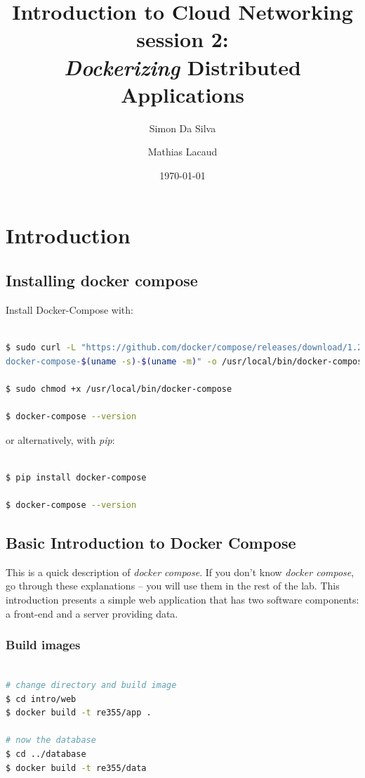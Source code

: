 \documentclass[a4paper,11pt]{exam}
\date{\today}
\title{Introduction to Cloud Networking session 2: \\
\textit{Dockerizing} Distributed Applications}
\author{Simon Da Silva \and Mathias Lacaud}
\begin{document}
	
		
	
\maketitle


\section{Introduction}
\subsection{Installing docker compose}
Install Docker-Compose with:

\begin{lstlisting}[frame=single,language={sh}]  % Start your code-block

$ sudo curl -L "https://github.com/docker/compose/releases/download/1.22.0/
docker-compose-$(uname -s)-$(uname -m)" -o /usr/local/bin/docker-compose

$ sudo chmod +x /usr/local/bin/docker-compose

$ docker-compose --version
\end{lstlisting}

or alternatively, with \textit{pip}: 

\begin{lstlisting}[frame=single,language={sh}]  % Start your code-block

$ pip install docker-compose

$ docker-compose --version
\end{lstlisting}


\subsection{Basic Introduction to Docker Compose}

This is a quick description of \textit{docker compose}. If you don't know \textit{docker compose}, go through these explanations -- you will use them in the rest of the lab.
This introduction presents a simple web application that has two software components: a front-end and a server providing data.

\subsubsection*{Build images}
\begin{lstlisting}[frame=single,language={sh}]  % Start your code-block

# change directory and build image
$ cd intro/web
$ docker build -t re355/app .

# now the database
$ cd ../database
$ docker build -t re355/data
\end{lstlisting}
\end{document}
